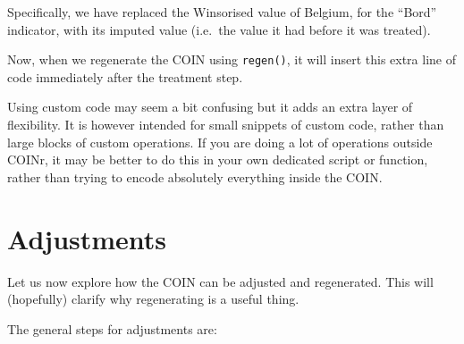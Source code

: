 \documentclass[
]{book}
\newenvironment{Shaded}{\begin{snugshade}}{\end{snugshade}}
\newcommand{\AlertTok}[1]{\textcolor[rgb]{0.94,0.16,0.16}{#1}}
\newcommand{\AttributeTok}[1]{\textcolor[rgb]{0.77,0.63,0.00}{#1}}
\newcommand{\CommentTok}[1]{\textcolor[rgb]{0.56,0.35,0.01}{\textit{#1}}}
\newcommand{\FunctionTok}[1]{\textcolor[rgb]{0.00,0.00,0.00}{#1}}
\newcommand{\NormalTok}[1]{#1}
\newcommand{\OtherTok}[1]{\textcolor[rgb]{0.56,0.35,0.01}{#1}}
\newcommand{\SpecialCharTok}[1]{\textcolor[rgb]{0.00,0.00,0.00}{#1}}
\newcommand{\StringTok}[1]{\textcolor[rgb]{0.31,0.60,0.02}{#1}}
\begin{document}
\begin{Shaded}
\end{Shaded}

Specifically, we have replaced the Winsorised value of Belgium, for the ``Bord'' indicator, with its imputed value (i.e.~the value it had before it was treated).

Now, when we regenerate the COIN using \texttt{regen()}, it will insert this extra line of code immediately after the treatment step.

Using custom code may seem a bit confusing but it adds an extra layer of flexibility. It is however intended for small snippets of custom code, rather than large blocks of custom operations. If you are doing a lot of operations outside COINr, it may be better to do this in your own dedicated script or function, rather than trying to encode absolutely everything inside the COIN.

\hypertarget{adjustments}{%
\section{Adjustments}\label{adjustments}}

Let us now explore how the COIN can be adjusted and regenerated. This will (hopefully) clarify why regenerating is a useful thing.

The general steps for adjustments are:
\end{document}
